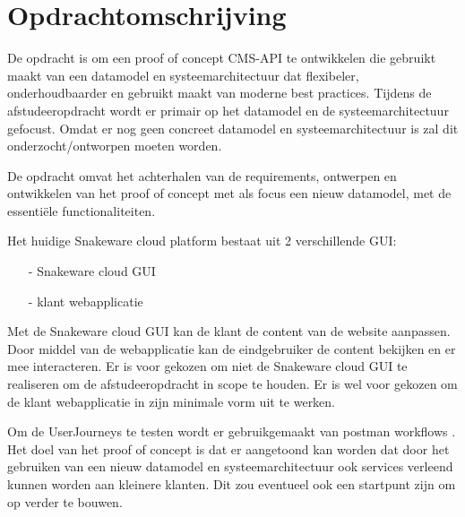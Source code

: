 \section{Opdrachtomschrijving}
\label{sec:Opdrachtomschrijving}
De opdracht is om een proof of concept CMS-API te ontwikkelen die gebruikt maakt van een datamodel en systeemarchitectuur dat flexibeler, onderhoudbaarder en gebruikt maakt van moderne best practices.
Tijdens de afstudeeropdracht wordt er primair op het datamodel en de systeemarchitectuur gefocust.
Omdat er nog geen concreet datamodel en systeemarchitectuur is zal dit onderzocht/ontworpen moeten worden.

\whitespace[2]
De opdracht omvat het achterhalen van de requirements, ontwerpen en ontwikkelen van het proof of concept met als focus een nieuw datamodel, met de essentiële functionaliteiten.

\whitespace[2]
Het huidige Snakeware cloud platform bestaat uit 2 verschillende \gls{GUI}:
\begin{itemize}
	\item[-] Snakeware cloud \gls{GUI}
	\item[-] klant webapplicatie
\end{itemize}

\whitespace
Met de Snakeware cloud \gls{GUI} kan de klant de content van de website aanpassen.
Door middel van de webapplicatie kan de eindgebruiker de content bekijken en er mee interacteren.
Er is voor gekozen om niet de Snakeware cloud \gls{GUI} te realiseren om de afstudeeropdracht in scope te houden.
Er is wel voor gekozen om de klant webapplicatie in zijn minimale vorm uit te werken.

\whitespace[2]
Om de \gls{UserJourneys} te testen wordt er gebruikgemaakt van postman workflows \Parencite{PostmanWorkflows}.
Het doel van het proof of concept is dat er aangetoond kan worden dat door het gebruiken van een nieuw datamodel en systeemarchitectuur ook services verleend kunnen worden aan kleinere klanten.
Dit zou eventueel ook een startpunt zijn om op verder te bouwen.
%
%
